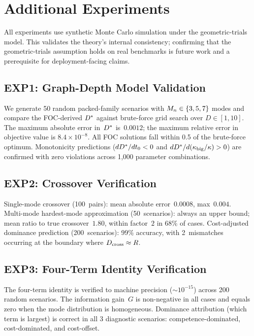 \section{Additional Experiments}
\label{app:experiments}

All experiments use synthetic Monte Carlo simulation under the geometric-trials model.
This validates the theory's internal consistency; confirming that the geometric-trials assumption holds on real benchmarks is future work and a prerequisite for deployment-facing claims.

\subsection{EXP1: Graph-Depth Model Validation}

We generate 50 random packed-family scenarios with $M_n \in \{3, 5, 7\}$ modes and compare the FOC-derived $D^*$ against brute-force grid search over $D \in [1, 10]$.
The maximum absolute error in~$D^*$ is~$0.0012$; the maximum relative error in objective value is $8.4 \times 10^{-8}$.
All FOC solutions fall within 0.5 of the brute-force optimum.
Monotonicity predictions ($dD^*/dt_0 < 0$ and $dD^*/d(\kappa_{\mathrm{big}}/\kappa) > 0$) are confirmed with zero violations across 1{,}000 parameter combinations.

\subsection{EXP2: Crossover Verification}

Single-mode crossover (100~pairs): mean absolute error~$0.0008$, max~$0.004$.
Multi-mode hardest-mode approximation (50~scenarios): always an upper bound; mean ratio to true crossover~$1.80$, within factor~$2$ in 68\% of cases.
Cost-adjusted dominance prediction (200~scenarios): 99\% accuracy, with 2~mismatches occurring at the boundary where $D_{\mathrm{cross}} \approx R$.

\subsection{EXP3: Four-Term Identity Verification}

The four-term identity is verified to machine precision ($\sim 10^{-15}$) across 200 random scenarios.
The information gain~$G$ is non-negative in all cases and equals zero when the mode distribution is homogeneous.
Dominance attribution (which term is largest) is correct in all 3 diagnostic scenarios: competence-dominated, cost-dominated, and cost-offset.

